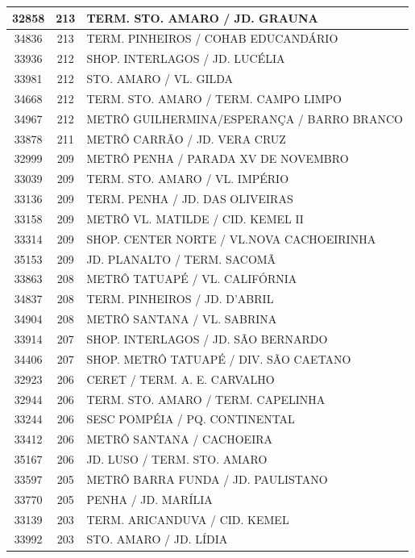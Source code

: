 \documentclass[
	12pt,				%
	oneside,			%
	a4paper,			%
	english,			%
	brazil				%
	]{abntex2ppgsi}
\begin{document}
{{{\begin{apendicesenv}
\begin{longtable}{c|c|p{7cm}}
 \hline 
32858 &	213 &	TERM. STO. AMARO / JD. GRAUNA \\ 
 \hline 
34836 &	213 &	TERM. PINHEIROS / COHAB EDUCANDÁRIO \\ 
 \hline 
33936 &	212 &	SHOP. INTERLAGOS / JD. LUCÉLIA \\ 
 \hline 
33981 &	212 &	STO. AMARO / VL. GILDA \\ 
 \hline 
34668 &	212 &	TERM. STO. AMARO / TERM. CAMPO LIMPO \\ 
 \hline 
34967 &	212 &	METRÔ GUILHERMINA/ESPERANÇA / BARRO BRANCO \\ 
 \hline 
33878 &	211 &	METRÔ CARRÃO / JD. VERA CRUZ \\ 
 \hline 
32999 &	209 &	METRÔ PENHA / PARADA XV DE NOVEMBRO \\ 
 \hline 
33039 &	209 &	TERM. STO. AMARO / VL. IMPÉRIO \\ 
 \hline 
33136 &	209 &	TERM. PENHA / JD. DAS OLIVEIRAS \\ 
 \hline 
33158 &	209 &	METRÔ VL. MATILDE / CID. KEMEL II \\ 
 \hline 
33314 &	209 &	SHOP. CENTER NORTE / VL.NOVA CACHOEIRINHA \\ 
 \hline 
35153 &	209 &	JD. PLANALTO / TERM. SACOMÃ \\ 
 \hline 
33863 &	208 &	METRÔ TATUAPÉ / VL. CALIFÓRNIA \\ 
 \hline 
34837 &	208 &	TERM. PINHEIROS / JD. D'ABRIL \\ 
 \hline 
34904 &	208 &	METRÔ SANTANA / VL. SABRINA \\ 
 \hline 
33914 &	207 &	SHOP. INTERLAGOS / JD. SÃO BERNARDO \\ 
 \hline 
34406 &	207 &	SHOP. METRÔ TATUAPÉ / DIV. SÃO CAETANO \\ 
 \hline 
32923 &	206 &	CERET / TERM. A. E. CARVALHO \\ 
 \hline 
32944 &	206 &	TERM. STO. AMARO / TERM. CAPELINHA \\ 
 \hline 
33244 &	206 &	SESC POMPÉIA / PQ. CONTINENTAL \\ 
 \hline 
33412 &	206 &	METRÔ SANTANA / CACHOEIRA \\ 
 \hline 
35167 &	206 &	JD. LUSO / TERM. STO. AMARO \\ 
 \hline 
33597 &	205 &	METRÔ BARRA FUNDA / JD. PAULISTANO \\ 
 \hline 
33770 &	205 &	PENHA / JD. MARÍLIA \\ 
 \hline 
33139 &	203 &	TERM. ARICANDUVA / CID. KEMEL \\ 
 \hline 
33992 &	203 &	STO. AMARO / JD. LÍDIA \\ 

\end{longtable}
\end{apendicesenv}}}}
\end{document}
